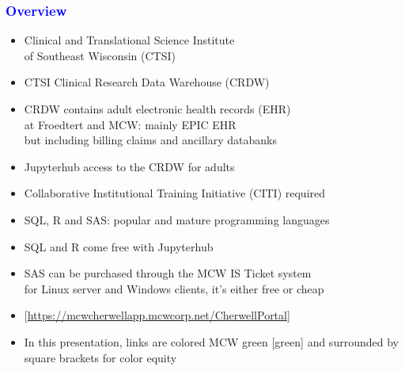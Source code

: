 \documentclass[11pt,pdftex,dvipsnames,usenames]{beamer}
\begin{document}
\begin{frame}[fragile]\frametitle{\bf\textcolor{blue}{Overview}}

\begin{itemize}
\item Clinical and Translational Science Institute\\
of Southeast Wisconsin (CTSI)
\item CTSI Clinical Research Data Warehouse (CRDW)
\item CRDW contains adult electronic health records (EHR)\\
at Froedtert and MCW: mainly EPIC EHR\\
but including billing claims and ancillary databanks
\item Jupyterhub access to the CRDW for adults
\item Collaborative Institutional Training Initiative (CITI) required
\item SQL, R and SAS: popular and mature programming languages
\item SQL and R come free with Jupyterhub
\item SAS can be purchased through the MCW IS Ticket system\\
 for Linux server and Windows clients, it's either free or cheap
\item \textcolor{PineGreen}{[\href{https://mcwcherwellapp.mcwcorp.net/CherwellPortal}{https://mcwcherwellapp.mcwcorp.net/CherwellPortal}]}
\item In this presentation, links are colored MCW green \textcolor{PineGreen}{[green]}
and surrounded by square brackets for color equity

\end{itemize}

\end{frame}
\end{document}
